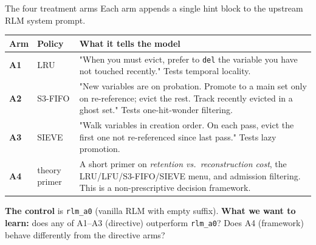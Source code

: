 \documentclass[aspectratio=169,10pt]{beamer}
\begin{document}
\begin{frame}{The four treatment arms}
\small Each arm appends a single hint block to the upstream RLM system prompt.
\vspace{0.4em}
\renewcommand{\arraystretch}{1.4}
\footnotesize
\begin{tabular}{@{}p{1.0cm} p{2.6cm} p{8.5cm}@{}}
\toprule
\textbf{Arm} & \textbf{Policy} & \textbf{What it tells the model} \\
\midrule
\textbf{A1} & LRU & "When you must evict, prefer to \texttt{del} the variable you
                   have not touched recently." Tests temporal locality. \\
\textbf{A2} & S3-FIFO  & "New variables are on probation. Promote to a main
                   set only on re-reference; evict the rest. Track recently
                   evicted in a ghost set." Tests one-hit-wonder filtering. \\
\textbf{A3} & SIEVE    & "Walk variables in creation order. On each pass,
                   evict the first one not re-referenced since last pass."
                   Tests lazy promotion. \\
\textbf{A4} & theory primer & A short primer on \emph{retention vs.\
                   reconstruction cost}, the LRU/LFU/S3-FIFO/SIEVE menu, and
                   admission filtering. This is a non-prescriptive
                   decision framework. \\
\bottomrule
\end{tabular}

\vspace{0.6em}
\textbf{The control} is \texttt{rlm\_a0} (vanilla RLM with empty suffix).
\textbf{What we want to learn:} does any of A1--A3 (directive) outperform
\texttt{rlm\_a0}? Does A4 (framework) behave differently from the directive
arms?
\end{frame}
\end{document}
